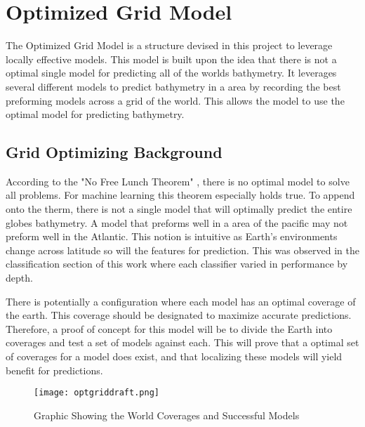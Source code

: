 \section{Optimized Grid Model}
\setlength{\parindent}{10ex}
The Optimized Grid Model is a structure devised in this project to leverage locally effective models.
This model is built upon the idea that there is not a optimal single model for predicting all of the worlds bathymetry.
It leverages several different models to predict bathymetry in a area by recording the best preforming models across a grid of the world.
This allows the model to use the optimal model for predicting bathymetry.

\subsection{Grid Optimizing Background}
According to the "No Free Lunch Theorem" \cite{wolpert1997no}, there is no optimal model to solve all problems.
For machine learning this theorem especially holds true.
To append onto the therm, there is not a single model that will optimally predict the entire globes bathymetry.
A model that preforms well in a area of the pacific may not preform well in the Atlantic.
This notion is intuitive as Earth's environments change across latitude so will the features for prediction.
This was observed in the classification section of this work where each classifier varied in performance by depth.

\par
There is potentially a configuration where each model has an optimal coverage of the earth.
This coverage should be designated to maximize accurate predictions.
Therefore, a proof of concept for this model will be to divide the Earth into coverages and test a set of models against each.
This will prove that a optimal set of coverages for a model does exist, and that localizing these models will yield benefit for predictions.

\begin{figure}[h]
    \centering
    \texttt{[image: optgriddraft.png]}
    \caption{Graphic Showing the World Coverages and Successful Models}
    \label{fig:coveragegrid}
\end{figure}

